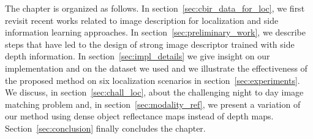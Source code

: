 The chapter is organized as follows. In section~\ref{sec:cbir_data_for_loc}, we first revisit recent works related to image description for localization and side information learning approaches. In section~\ref{sec:preliminary_work}, we describe steps that have led to the design of strong image descriptor trained with side depth information. In section~\ref{sec:impl_details} we give insight on our implementation and on the dataset we used and we illustrate the effectiveness of the proposed method on six localization scenarios in section~\ref{sec:experiments}. We discuss, in section~\ref{sec:chall_loc}, about the challenging night to day image matching problem and, in section~\ref{sec:modality_ref}, we present a variation of our method using dense object reflectance maps instead of depth maps. Section~\ref{sec:conclusion} finally concludes the chapter.

